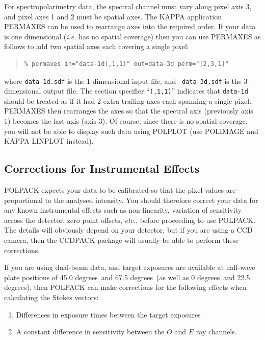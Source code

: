 \documentclass[twoside,11pt]{article}
\newcommand{\htmlref}[2]{#1}
\newcommand{\xref}[3]{#1}
\renewcommand{\_}{\texttt{\symbol{95}}}
\newenvironment{myquote}{\begin{quote}\begin{small}}{\end{small}\end{quote}}
\newcommand{\dgs}{\hbox{$^\circ$}}
\renewcommand{\dgs}{ degrees}
\begin{document}
For spectropolarimetry data, the spectral channel must vary along pixel
axis 3, and pixel axes 1 and 2 must be spatial axes. The KAPPA
application \xref{PERMAXES}{sun95}{PERMAXES} can be used to rearrange
axes into the required order. If your data is one dimensional
(\emph{i.e.} has no spatial coverage) then you can use PERMAXES as
follows to add two spatial axes each covering a single pixel:

\begin{myquote}
\begin{verbatim}
% permaxes in="data-1d(,1,1)" out=data-3d perm="[2,3,1]"
\end{verbatim}
\end{myquote}

where {\tt data-1d.sdf} is the 1-dimensional input file, and {\tt
data-3d.sdf} is the 3-dimensional output file. The section specifier
``{\tt (,1,1)}'' indicates that {\tt data-1d} should be treated as if it
had 2 extra trailing axes each spanning a single pixel. PERMAXES then
rearranges the axes so that the spectral axis (previously axis 1) becomes
the last axis (axis 3). Of course, since there is no spatial coverage,
you will not be able to display such data using \htmlref{POLPLOT}{POLPLOT} 
(use \htmlref{POLIMAGE}{POLIMAGE} and KAPPA \xref{LINPLOT}{sun95}{LINPLOT} 
instead). 

\subsection{\label{SEC:CCDPACK}Corrections for Instrumental Effects}
POLPACK expects your data to be calibrated so that the pixel values are
proportional to the analysed intensity. You should therefore correct your
data for any known instrumental effects such as non-linearity, variation
of sensitivity across the detector, zero point offsets, \emph{etc.}, before
proceeding to use POLPACK. The details will obviously depend on your
detector, but if you are using a CCD camera, then the \xref{CCDPACK}{sun139}{} 
package  will usually be able to perform these corrections.

If you are using dual-beam data, and target exposures are available at 
half-wave plate positions of
45.0\dgs\ and 67.5\dgs\ (as well as 0\dgs\ and 22.5\dgs), then POLPACK can
make corrections for the following effects when calculating the Stokes
vectors:

\begin{enumerate}
\item Differences in exposure times between the target exposures
\item A constant difference in sensitivity between the $O$ and $E$ ray
channels.
\end{enumerate}
\end{document}
